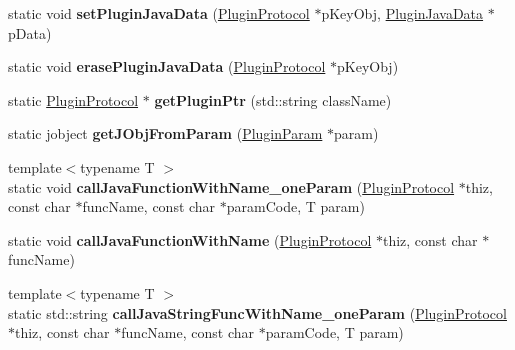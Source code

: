 \begin{DoxyCompactItemize}
static void {\bfseries set\+Plugin\+Java\+Data} (\hyperlink{classcocos2d_1_1plugin_1_1PluginProtocol}{Plugin\+Protocol} $\ast$p\+Key\+Obj, \hyperlink{structcocos2d_1_1plugin_1_1__PluginJavaData__}{Plugin\+Java\+Data} $\ast$p\+Data)
\item 
\mbox{\label{classcocos2d_1_1plugin_1_1PluginUtils_a3281996cb70885142799414e33541a53}} 
static void {\bfseries erase\+Plugin\+Java\+Data} (\hyperlink{classcocos2d_1_1plugin_1_1PluginProtocol}{Plugin\+Protocol} $\ast$p\+Key\+Obj)
\item 
\mbox{\label{classcocos2d_1_1plugin_1_1PluginUtils_a3a88d093fe02f942918efdd063300547}} 
static \hyperlink{classcocos2d_1_1plugin_1_1PluginProtocol}{Plugin\+Protocol} $\ast$ {\bfseries get\+Plugin\+Ptr} (std\+::string class\+Name)
\item 
\mbox{\label{classcocos2d_1_1plugin_1_1PluginUtils_a578ea0540529c81a20971f10e48be7b6}} 
static jobject {\bfseries get\+J\+Obj\+From\+Param} (\hyperlink{classcocos2d_1_1plugin_1_1PluginParam}{Plugin\+Param} $\ast$param)
\item 
\mbox{\label{classcocos2d_1_1plugin_1_1PluginUtils_a33cd610f1651ce7b5f4197f2258fa83a}} 
{\footnotesize template$<$typename T $>$ }\\static void {\bfseries call\+Java\+Function\+With\+Name\+\_\+one\+Param} (\hyperlink{classcocos2d_1_1plugin_1_1PluginProtocol}{Plugin\+Protocol} $\ast$thiz, const char $\ast$func\+Name, const char $\ast$param\+Code, T param)
\item 
\mbox{\label{classcocos2d_1_1plugin_1_1PluginUtils_a41ef4f6dc1f002a693a6c55b4ac8f95f}} 
static void {\bfseries call\+Java\+Function\+With\+Name} (\hyperlink{classcocos2d_1_1plugin_1_1PluginProtocol}{Plugin\+Protocol} $\ast$thiz, const char $\ast$func\+Name)
\item 
\mbox{\label{classcocos2d_1_1plugin_1_1PluginUtils_a3179c69363a8539d6ce2f87d53af37e2}} 
{\footnotesize template$<$typename T $>$ }\\static std\+::string {\bfseries call\+Java\+String\+Func\+With\+Name\+\_\+one\+Param} (\hyperlink{classcocos2d_1_1plugin_1_1PluginProtocol}{Plugin\+Protocol} $\ast$thiz, const char $\ast$func\+Name, const char $\ast$param\+Code, T param)

\end{DoxyCompactItemize}
